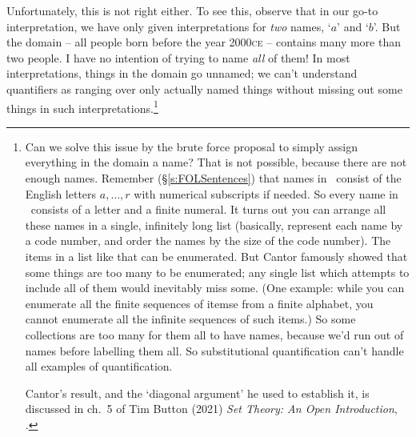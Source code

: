 \begin{earg}
Unfortunately, this is not right either. To see this, observe that in our go-to interpretation, we have only given interpretations for \emph{two} names, `$a$' and `$b$'. But the domain – all people born before the year 2000\textsc{ce} – contains many more than two people. I have no intention of trying to name \emph{all} of them!  In most interpretations, things in the domain go unnamed; we can't understand quantifiers as ranging over only actually named things without missing out some things in such interpretations.\footnote{Can we solve this issue by the brute force proposal to simply assign everything in the domain a name? That is not possible, because there are not enough names. Remember (§\ref{s:FOLSentences}) that names in \FOL\ consist of the English letters $a,…,r$ with numerical subscripts if needed. So every name in \FOL\ consists of a letter and a finite numeral. It turns out you can arrange all these names in a single, infinitely long list (basically, represent each name by a code number, and order the names by the size of the code number). The items in a list like that can be enumerated. But Cantor famously showed that some things are too many to be enumerated; any single list which attempts to include all of them would inevitably miss some. (One example: while you can enumerate all the finite sequences of itemse from a finite alphabet, you cannot enumerate all the infinite sequences of such items.) So some collections are too many for them all to have names, because we'd run out of names before labelling them all. So substitutional quantification can't handle all examples of quantification.

Cantor's result, and the `diagonal argument' he used to establish it, is discussed in ch.~5 of Tim Button (2021) \emph{Set Theory: An Open Introduction}, .}



\end{earg}
